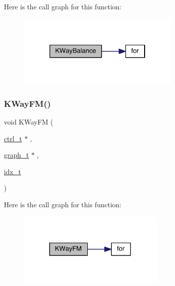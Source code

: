 Here is the call graph for this function\+:\nopagebreak
\begin{figure}[H]
\begin{center}
\leavevmode
\includegraphics[width=226pt]{a00951_aa1854c6e5d38950ac52237275f55ca2f_cgraph}
\end{center}
\end{figure}
\mbox{\label{a00951_a57fb9823820ddca4e34df05aac013277}} 
\subsubsection{\texorpdfstring{K\+Way\+F\+M()}{KWayFM()}}
{\footnotesize\ttfamily void K\+Way\+FM (\begin{DoxyParamCaption}\item[{\hyperlink{a00742}{ctrl\+\_\+t} $\ast$}]{,  }\item[{\hyperlink{a00734}{graph\+\_\+t} $\ast$}]{,  }\item[{\hyperlink{a00876_aaa5262be3e700770163401acb0150f52}{idx\+\_\+t}}]{ }\end{DoxyParamCaption})}

Here is the call graph for this function\+:\nopagebreak
\begin{figure}[H]
\begin{center}
\leavevmode
\includegraphics[width=204pt]{a00951_a57fb9823820ddca4e34df05aac013277_cgraph}
\end{center}
\end{figure}
\mbox{\label{a00951_a5c42d043dc7f9e6d0b955a4d004a7470}} 
